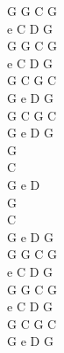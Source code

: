 \documentclass[a5paper, 10pt]{book}
\begin{document}
\begin{minipage}[t]{0.2\textwidth}
G G C G \\
e C D G\\
G G C G \\
e C D G\\
G C G C\\
G e D G\\
G C G C\\
G e D G\\

G\\
C\\
G e D\\
G\\
C\\
G e D G\\

G G C G \\
e C D G\\
G G C G \\
e C D G\\
G C G C\\
G e D G\\
\end{minipage}

\end{document}
